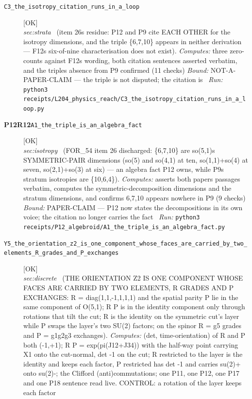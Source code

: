 \begin{description}
\item[\label{rcpt:C3_the_isotropy_citation_runs_in_a_loop}\textbf{}\quad\texttt{C3\_the\_isotropy\_citation\_runs\_in\_a\_loop}]\hfill\textsf{[OK]}\\
\textit{sec:strata} \ (item 26s residue: P12 and P9 cite EACH OTHER for the isotropy dimensions, and the triple \{6,7,10\} appears in neither derivation --- F12s six-of-nine characterisation does not exist). 
\emph{Computes:} three zero-counts against F12s wording, both citation sentences asserted verbatim, and the triples absence from P9 confirmed (11 checks)
 \emph{Bound:} NOT-A-PAPER-CLAIM --- the triple is not disputed; the citation is
\ \emph{Run:} \texttt{python3 receipts/L204\_physics\_reach/C3\_the\_isotropy\_citation\_runs\_in\_a\_loop.py}
\item[\textbf{P12R12}\quad\texttt{A1\_the\_triple\_is\_an\_algebra\_fact}]\hfill\textsf{[OK]}\\
\textit{sec:isotropy} \ (FOR\_54 item 26 discharged: \{6,7,10\} are so(5,1)s SYMMETRIC-PAIR dimensions (so(5) and so(4,1) at ten, so(1,1)+so(4) at seven, so(2,1)+so(3) at six) --- an algebra fact P12 owns, while P9s stratum isotropies are \{10,6,4\}). 
\emph{Computes:} asserts both papers passages verbatim, computes the symmetric-decomposition dimensions and the stratum dimensions, and confirms 6,7,10 appears nowhere in P9 (9 checks)
 \emph{Bound:} PAPER-CLAIM --- P12 now states the decompositions in its own voice; the citation no longer carries the fact
\ \emph{Run:} \texttt{python3 receipts/P12\_algebroid/A1\_the\_triple\_is\_an\_algebra\_fact.py}
\item[\label{rcpt:Y5_the_orientation_z2_is_one_component_whose_faces_are_carried_by_two_elements_R_grades_and_P_exchanges}\textbf{}\quad\texttt{Y5\_the\_orientation\_z2\_is\_one\_component\_whose\_faces\_are\_carried\_by\_two\_elements\_R\_grades\_and\_P\_exchanges}]\hfill\textsf{[OK]}\\
\textit{sec:discrete} \ (THE ORIENTATION Z2 IS ONE COMPONENT WHOSE FACES ARE CARRIED BY TWO ELEMENTS, R GRADES AND P EXCHANGES: R = diag(1,1,-1,1,1,1) and the spatial parity P lie in the same component of O(5,1); R P is in the identity component only through rotations that tilt the cut; R is the identity on the symmetric cut's layer while P swaps the layer's two SU(2) factors; on the spinor R = g5 grades and P = g1g2g3 exchanges). 
\emph{Computes:} (det, time-orientation) of R and P both (-1,+1); R P = exp(pi(J12+J34)) with the half-way point carrying X1 onto the cut-normal, det -1 on the cut; R restricted to the layer is the identity and keeps each factor, P restricted has det -1 and carries su(2)+ onto su(2)-; the Clifford (anti)commutations; one P11, one P12, one P17 and one P18 sentence read live. CONTROL: a rotation of the layer keeps each factor

\end{description}
